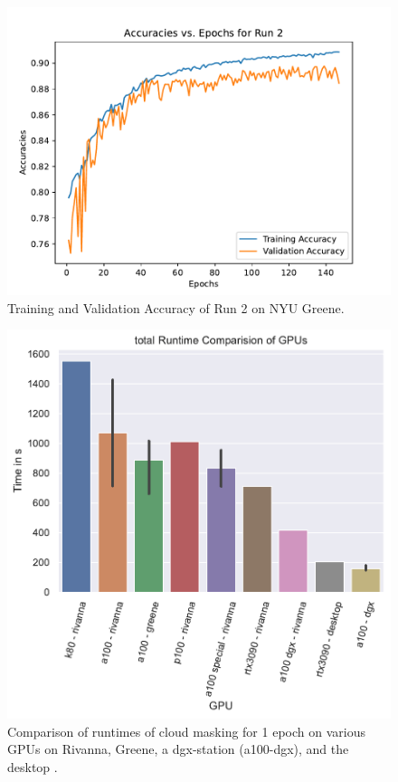 \documentclass[sigplan,screen]{acmart}
\begin{document}
\begin{figure}[ht]
\centering\includegraphics[width=1.0\columnwidth]{images/epoch_vs_accuracy (2).pdf}
\caption{Training and Validation Accuracy of Run 2 on NYU Greene.}
\label{fig:Accuracies of Run 2}
\end{figure}



\begin{figure}[ht]
\centering\includegraphics[width=1.0\columnwidth]{images/gregor-epoch-1.pdf}
\caption{Comparison of runtimes of cloud masking for 1 epoch on various GPUs on Rivanna, Greene, a dgx-station (a100-dgx), and the desktop \cite{las-2023-escience-cloudmask}.}
\label{fig:epoch-compare}
\end{figure}
\end{document}
